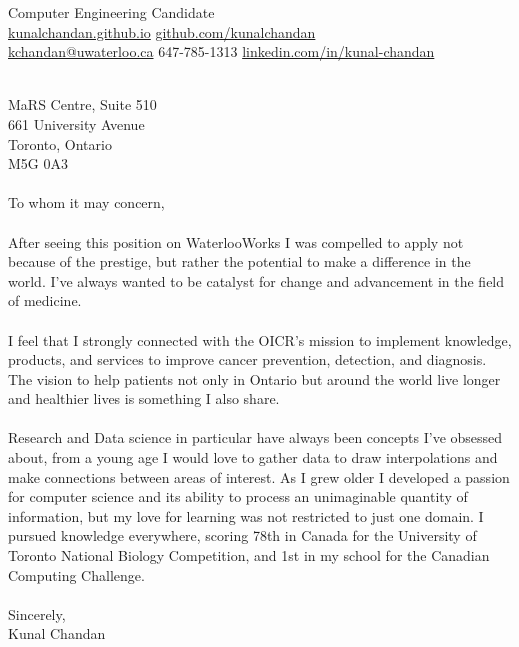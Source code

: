 \documentclass[]{chandan-cv}
\begin{document}
%
%

%
%
{ 
Computer Engineering Candidate \\
\href{http://kunalchandan.github.io}{kunalchandan.github.io}
\hfill
\href{http://github.com/kunalchandan}{github.com/kunalchandan}\\
\href{mailto:kchandan@uwaterloo.ca}{kchandan@uwaterloo.ca}
\hfill
647-785-1313
\hfill 
\href{https://www.linkedin.com/in/kunal-chandan/}{linkedin.com/in/kunal-chandan}
}
\begin{minipage}[t]{0.2\textwidth}
\end{minipage}
\begin{minipage}[t]{0.8\textwidth}
\\
\vspace{50}
\large
MaRS Centre, Suite 510 \\
661 University Avenue \\
Toronto, Ontario\\
M5G 0A3\\
\\
To whom it may concern,\\
\\
After seeing this position on WaterlooWorks I was compelled to apply not because of the prestige, but rather the potential to make a difference in the world. I’ve always wanted to be catalyst for change and advancement in the field of medicine.\\
\\
I feel that I strongly connected with the OICR’s mission to implement knowledge, products, and services to improve cancer prevention, detection, and diagnosis. The vision to help patients not only in Ontario but around the world live longer and healthier lives is something I also share.\\
\\
Research and Data science in particular have always been concepts I’ve obsessed about, from a young age I would love to gather data to draw interpolations and make connections between areas of interest. As I grew older I developed a passion for computer science and its ability to process an unimaginable quantity of information, but my love for learning was not restricted to just one domain. I pursued knowledge everywhere, scoring 78th in Canada for the University of Toronto National Biology Competition, and 1st in my school for the Canadian Computing Challenge.\\
\\
Sincerely,\\
Kunal Chandan\\
\\
\end{minipage}
\end{document}
